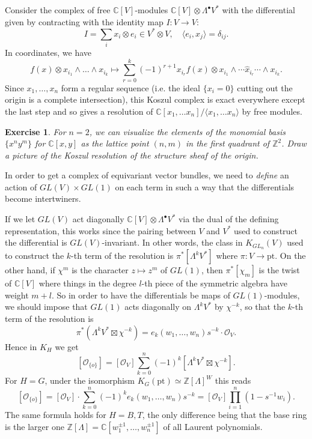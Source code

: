 \documentclass[11pt]{amsart}
\newtheorem{exercise}[dummy]{Exercise}
\theoremstyle{definition}
\newcommand{\bC}{\mathbb{C}}
\newcommand{\bZ}{\mathbb{Z}}
\newcommand{\Oc}{\mathcal{O}}
\numberwithin{equation}{subsection}
\numberwithin{figure}{subsection}
\newcommand{\pt}{\mathrm{pt}}
\begin{document}
Consider the complex of free $\mathbb{C}[V]$-modules $\mathbb{C}[V]\otimes \Lambda^\bullet V^* $ with the differential given by contracting with the identity map $I:V\rightarrow V$:
$$
I = \sum_i x_i\otimes e_i \in V^*\otimes V, \quad \langle e_i,x_j\rangle=\delta_{ij}.
$$
In coordinates, we have
$$
f(x)\otimes x_{i_1}\wedge\ldots\wedge x_{i_k} \mapsto \sum_{r=0}^{k}(-1)^{r+1}x_{i_r}f(x)\otimes x_{i_1}\wedge\cdots\widehat{x}_{i_r}\cdots\wedge x_{i_k}.
$$
Since $x_1,\ldots, x_n$ form a regular sequence (i.e. the  ideal $\{x_i=0\}$ cutting out the origin is a complete intersection), this Koszul complex is exact everywhere except the last step and so gives a resolution of $\bC[x_1,\ldots x_n]/\langle x_1,\ldots x_n\rangle$ by free modules.
\begin{exercise}
For $n=2$, we can visualize the elements of the monomial basis $\{x^ny^m\}$ for $\bC[x,y]$ as the lattice point $(n,m)$ in the first quadrant of $\mathbb{Z}^2$. Draw a picture of the Koszul resolution of the structure sheaf of the origin.
\end{exercise}
In order to get a complex of equivariant vector bundles, we need to \emph{define} an action of $GL(V)\times GL(1)$ on each term in such a way that the differentials become intertwiners.

If we let $GL(V)$ act diagonally $\mathbb{C}[V]\otimes \Lambda^\bullet V^*$ via the dual of the defining representation, this works since the pairing between $V$ and $V^*$ used to construct the differential is $GL(V)$-invariant. In other words, the class in $K_{GL_n}(V)$ used to construct the $k$-th term of the resolution is $\pi^*[\Lambda^k V^*]$ where $\pi:V\rightarrow \pt$. On the other hand, if $\chi^m$ is the character $z\mapsto z^m$ of $GL(1)$, then $\pi^*[\chi_m]$ is the twist of $\bC[V]$ where things in the degree $l$-th piece of the symmetric algebra have weight $m+l$. So in order to have the differentials be maps of $GL(1)$-modules, we should impose that $GL(1)$ acts diagonally on $\Lambda^kV^*$ by $\chi^{-k}$, so that the $k$-th term of the resolution is
$$
\pi^*\left( \Lambda^k V^*\boxtimes \chi^{-k}\right)= e_k(w_1,\ldots, w_{n})s^{-k}\cdot \Oc_V.
$$
Hence in $K_H$ we get
$$
[\Oc_{\{o\}}] =  [\Oc_{V}]\sum_{k=0}^{n}(-1)^k [\Lambda^k V^*\boxtimes \chi^{-k}].
$$
For $H=G$, under the isomorphism $K_G(\pt)\simeq \mathbb{Z}[\Lambda]^W$ this reads
$$
[\Oc_{\{o\}}] = [\Oc_V]\cdot\sum_{k=0}^{n}(-1)^ke_k(w_1,\ldots, w_{n})s^{-k} = [\Oc_V]\prod_{i=1}^{n}(1-s^{-1}w_i).
$$
The same formula holds for $H=B,T$, the only difference being that the base ring is the larger one $\bZ[\Lambda]=\bC[w_1^{\pm1},\ldots, w^{\pm1}_{n}]$ of all Laurent polynomials.
\end{document}
